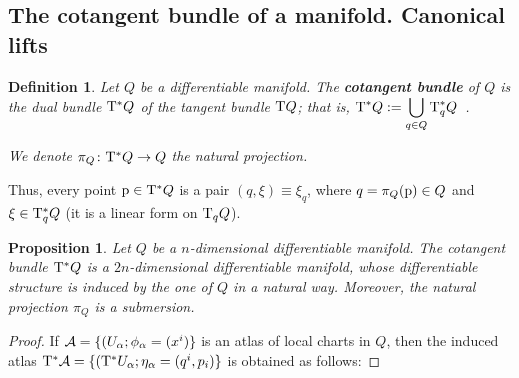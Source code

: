 \documentclass[12pt]{report}
\newtheorem{prop}[teor]{Proposition}
\newtheorem{definition}[teor]{Definition}
\def\dst{\displaystyle}
\def\Tan{{\rm T}}
\begin{document}
\begin{appendix}
\subsection{The cotangent bundle of a manifold. Canonical lifts}
\label{sec:cotbun}


\begin{definition}
Let $Q$ be a differentiable manifold.
The \textbf{cotangent bundle} of $Q$ is the dual bundle
$\Tan ^*Q$ of the tangent bundle $\Tan Q$;
that is,  \(\dst \Tan^*Q := \bigcup_{q \in Q}\Tan^*_qQ\)~.

We denote $\pi_Q \colon \Tan^*Q \to Q$ the natural projection.
\end{definition}

Thus, every point ${\rm p} \in \Tan^*Q$ is a pair
$(q,\xi)\equiv\xi_q$, where $q=\pi_Q ({\rm p}) \in Q$
and $\xi \in \Tan^*_qQ$ (it is a linear form on $\Tan_qQ$).

\begin{prop}
\label{prop:cotbun}
Let $Q$ be a $n$-dimensional differentiable manifold.
The cotangent bundle $\Tan^* Q$ is a $2n$-dimensional differentiable manifold, 
whose differentiable structure is induced by the one of $Q$ in a natural way.
Moreover, the natural projection $\pi_Q$ is a submersion.
\end{prop}
\begin{proof}
If ${\cal A}=\{ (U_\alpha;\phi_\alpha=(x^i) \}$ is an atlas of local charts in $Q$,
then the induced atlas
$\Tan^*{\cal A}=\{ (\Tan^*U_\alpha;\eta_\alpha=(q^i,p_i) \}$
is obtained as follows:


\end{proof}
\end{appendix}
\end{document}
